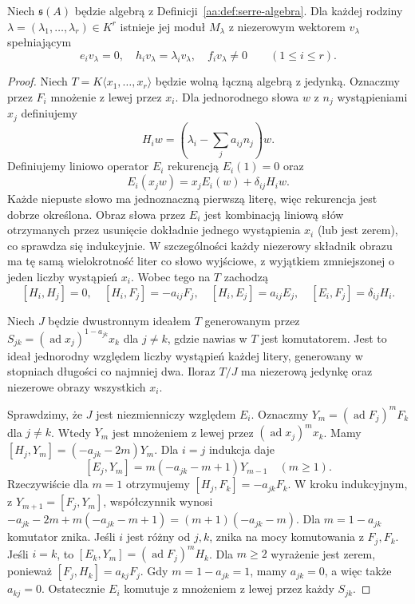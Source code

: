 \begin{twierdzenie}
\label{aa:tw:serre-highest-module}
Niech $\mathfrak s(A)$ będzie algebrą z Definicji~\ref{aa:def:serre-algebra}. Dla każdej rodziny $\lambda=(\lambda_1,\ldots,\lambda_r)\in K^r$ istnieje jej moduł $M_\lambda$ z niezerowym wektorem $v_\lambda$ spełniającym
\[
 e_i v_\lambda=0,\quad h_i v_\lambda=\lambda_i v_\lambda,\quad
 f_i v_\lambda\ne0\qquad(1\le i\le r).
\]
\end{twierdzenie}
\begin{proof}
Niech $T=K\langle x_1,\ldots,x_r\rangle$ będzie wolną łączną algebrą z jedynką. Oznaczmy przez $F_i$ mnożenie z lewej przez $x_i$. Dla jednorodnego słowa $w$ z $n_j$ wystąpieniami $x_j$ definiujemy
\[
 H_iw=\left(\lambda_i-\sum_j a_{ij}n_j\right)w.
\]
Definiujemy liniowo operator $E_i$ rekurencją $E_i(1)=0$ oraz
\[
 E_i(x_jw)=x_jE_i(w)+\delta_{ij}H_iw.
\]
Każde niepuste słowo ma jednoznaczną pierwszą literę, więc rekurencja jest dobrze określona. Obraz słowa przez $E_i$ jest kombinacją liniową słów otrzymanych przez usunięcie dokładnie jednego wystąpienia $x_i$ (lub jest zerem), co sprawdza się indukcyjnie. W szczególności każdy niezerowy składnik obrazu ma tę samą wielokrotność liter co słowo wyjściowe, z wyjątkiem zmniejszonej o jeden liczby wystąpień $x_i$. Wobec tego na $T$ zachodzą
\[
 [H_i,H_j]=0,\quad [H_i,F_j]=-a_{ij}F_j,\quad
 [H_i,E_j]=a_{ij}E_j,\quad [E_i,F_j]=\delta_{ij}H_i.
\]

Niech $J$ będzie dwustronnym ideałem $T$ generowanym przez
$S_{jk}=(\operatorname{ad}x_j)^{1-a_{jk}}x_k$ dla $j\ne k$, gdzie nawias w $T$ jest komutatorem. Jest to ideał jednorodny względem liczby wystąpień każdej litery, generowany w stopniach długości co najmniej dwa. Iloraz $T/J$ ma niezerową jedynkę oraz niezerowe obrazy wszystkich $x_i$.

Sprawdzimy, że $J$ jest niezmienniczy względem $E_i$. Oznaczmy $Y_m=(\operatorname{ad}F_j)^m F_k$ dla $j\ne k$. Wtedy $Y_m$ jest mnożeniem z lewej przez $(\operatorname{ad}x_j)^m x_k$. Mamy
$[H_j,Y_m]=(-a_{jk}-2m)Y_m$.
Dla $i=j$ indukcja daje
\[
 [E_j,Y_m]=m(-a_{jk}-m+1)Y_{m-1}\quad(m\ge1).
\]
Rzeczywiście dla $m=1$ otrzymujemy $[H_j,F_k]=-a_{jk}F_k$. W kroku indukcyjnym, z $Y_{m+1}=[F_j,Y_m]$, współczynnik wynosi
$-a_{jk}-2m+m(-a_{jk}-m+1)=(m+1)(-a_{jk}-m)$.
Dla $m=1-a_{jk}$ komutator znika. Jeśli $i$ jest różny od $j,k$, znika na mocy komutowania z $F_j,F_k$. Jeśli $i=k$, to $[E_k,Y_m]=(\operatorname{ad}F_j)^m H_k$. Dla $m\ge2$ wyrażenie jest zerem, ponieważ $[F_j,H_k]=a_{kj}F_j$. Gdy $m=1-a_{jk}=1$, mamy $a_{jk}=0$, a więc także $a_{kj}=0$. Ostatecznie $E_i$ komutuje z mnożeniem z lewej przez każdy $S_{jk}$.


\end{proof}
